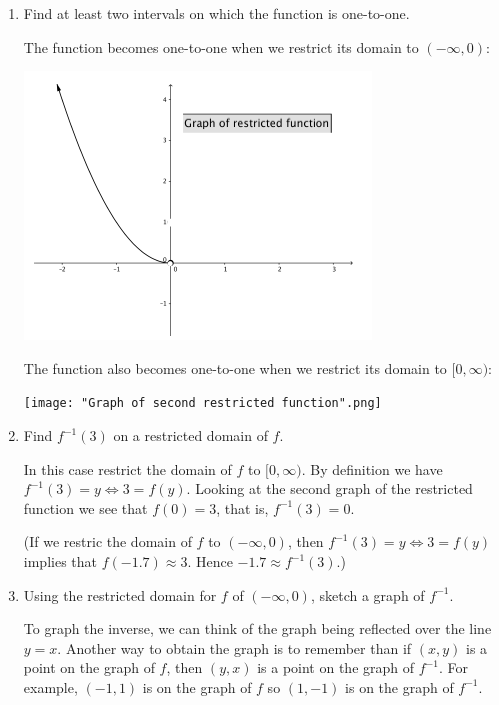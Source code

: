 \documentclass[nooutcomes]{ximera}
\begin{document}
\begin{problem}
\begin{enumerate}
    \item
      Find at least two intervals on which the function is one-to-one.
      \begin{freeResponse}
        The function becomes one-to-one when we restrict its domain to $(-\infty, 0)$:
        \begin{image}
          \includegraphics[scale = 0.8]{figure2.png}
        \end{image}
        The function also becomes one-to-one when we restrict its domain to $[0, \infty)$:
        \begin{image}
          \texttt{[image: "Graph of second restricted function".png]}
        \end{image}
      \end{freeResponse}

    \item
      Find $f^{-1}(3)$ on a restricted domain of $f$.
      \begin{freeResponse}
        In this case restrict the domain of $f$ to $[0, \infty)$.
        By definition we have $f^{-1}(3) = y \iff 3 = f(y)$.
        Looking at the second graph of the restricted function we see that $f(0) = 3$, that is, $f^{-1}(3) = 0$.

        (If we restric the domain of $f$ to $(-\infty, 0)$, then $f^{-1}(3) = y \iff 3 = f(y)$ implies that $f(-1.7) \approx 3$.
        Hence $-1.7 \approx f^{-1}(3)$.)
      \end{freeResponse}
      
	\item
	Using the restricted domain for $f$ of $(-\infty,0)$, sketch a graph of $f^{-1}$.  
	\begin{freeResponse}
	To graph the inverse, we can think of the graph being reflected over the line $y=x$.  Another way to obtain the graph is to remember than if $(x,y)$ is a point on the graph of $f$, then $(y,x)$ is a point on the graph of $f^{-1}$.  For example, $(-1,1)$ is on the graph of $f$ so $(1,-1)$ is on the graph of $f^{-1}$.
	

\end{freeResponse}
\end{enumerate}
\end{problem}
\end{document}
